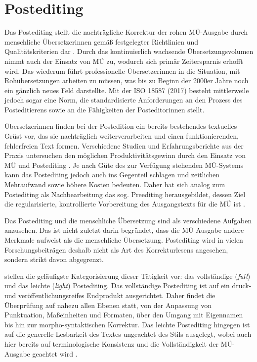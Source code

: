 
\section{Postediting}
\label{K3:sec:PE}


Das Postediting stellt die nachträgliche Korrektur der rohen MÜ-Ausgabe durch menschliche Übersetzer{\textperiodcentered}innen gemäß festgelegter Richtlinien und Qualitätskriterien dar \citep[197\psq]{obrien_post-editing_2014}. Durch das kontinuierlich wachsende Übersetzungsvolumen nimmt auch der Einsatz von MÜ zu, wodurch sich primär Zeitersparnis erhofft wird. Das wiederum führt professionelle Übersetzer{\textperiodcentered}innen in die Situation, mit Rohübersetzungen arbeiten zu müssen, was bis zu Beginn der 2000er Jahre noch ein gänzlich neues Feld darstellte. Mit der ISO 18587 (2017) besteht mittlerweile jedoch sogar eine Norm, die standardisierte Anforderungen an den Prozess des Posteditierens sowie an die Fähigkeiten der Posteditor{\textperiodcentered}innen stellt.

Übersetzer{\textperiodcentered}innen finden bei der Postedition ein bereits bestehendes textuelles Grüst vor, das sie nachträglich weiterverarbeiten und einen funktionierenden, fehlerfreien Text formen. Verschiedene Studien und Erfahrungsberichte aus der Praxis untersuchen den möglichen Produktivitätsgewinn durch den Einsatz von MÜ und Postediting \citep[]{castilho_reading_2018, macken_quantifying_2020}. Je nach Güte des zur Verfügung stehenden MÜ-Systems kann das Postediting jedoch auch ins Gegenteil schlagen und zeitlichen Mehraufwand sowie höhere Kosten bedeuten. Daher hat sich analog zum Postediting als Nachbearbeitung das sog. Preediting herausgebildet, dessen Ziel die regularisierte, kontrollierte Vorbereitung des Ausgangstexts für die MÜ ist \citep[164]{baker_routledge_2011}.

Das Postediting und die menschliche Übersetzung sind als verschiedene Aufgaben anzusehen. Das ist nicht zuletzt darin begründet, dass die MÜ-Ausgabe andere Merkmale aufweist als die menschliche Übersetzung. Postediting wird in vielen Forschungsbeiträgen deshalb nicht als Art des Korrekturlesens angesehen, sondern strikt davon abgegrenzt.

\citet[8\psq]{massardo_mt_2016} stellen die geläufigste Kategorisierung dieser Tätigkeit vor: das vollständige (\emph{full}) und das leichte (\emph{light}) Postediting. Das vollständige Postediting ist auf ein druck- und veröffentlichungsreifes Endprodukt ausgerichtet. Daher findet die Überprüfung auf nahezu allen Ebenen statt, von der Anpassung von Punktuation, Maßeinheiten und Formaten, über den Umgang mit Eigennamen bis hin zur morpho-syntaktischen Korrektur. Das leichte Postediting hingegen ist auf die generelle Lesbarkeit des Textes ungeachtet des Stils ausgelegt, wobei auch hier bereits auf terminologische Konsistenz und die Vollständigkeit der MÜ-Ausgabe geachtet wird \citep[16\psq]{massardo_mt_2016}.

